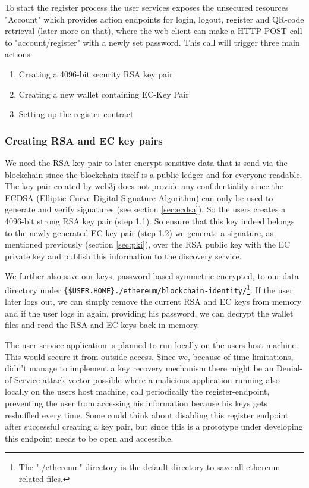 To start the register process the user services exposes the unsecured resources "Account" which provides action endpoints for login, logout, register and QR-code retrieval (later more on that), where the web client can make a HTTP-POST call to "account/register" with a newly set password.
This call will trigger three main actions:

\begin{enumerate}
\item Creating a 4096-bit security RSA key pair
\item Creating a new wallet containing EC-Key Pair 
\item Setting up the register contract 
\end{enumerate}

\subsubsection{Creating RSA and EC key pairs}
We need the RSA key-pair to later encrypt sensitive data that is send via the blockchain since the blockchain itself is a public ledger and for everyone readable. The key-pair created by web3j does not provide any confidentiality since the ECDSA (Elliptic Curve Digital Signature Algorithm) can only be used to generate and verify signatures (see section \ref{sec:ecdsa}). So the users creates a 4096-bit strong RSA key pair (step 1.1). So ensure that this key indeed belongs to the newly generated EC key-pair (step 1.2) we generate a signature, as mentioned previously (section \ref{sec:pki}), over the RSA public key with the EC private key and publish this information to the discovery service.

We further also save our keys, password based symmetric encrypted, to our data directory under \lstinline|{$USER.HOME}./ethereum/blockchain-identity/|\footnote{The "./ethereum" directory is the default directory to save all ethereum related files.}. If the user later logs out, we can simply remove the current RSA and EC keys from memory and if the user logs in again, providing his password, we can decrypt the wallet files and read the RSA and EC keys back in memory. 

The user service application is planned to run locally on the users host machine. This would secure it from outside access. Since we, because of time limitations, didn’t manage to implement a key recovery mechanism there might be an Denial-of-Service attack vector possible where a malicious application running also locally on the users host machine, call periodically the register-endpoint, preventing the user from accessing his information because his keys gets reshuffled every time. Some could think about disabling this register endpoint after successful creating a key pair, but since this is a prototype under developing this endpoint needs to be open and accessible. 

